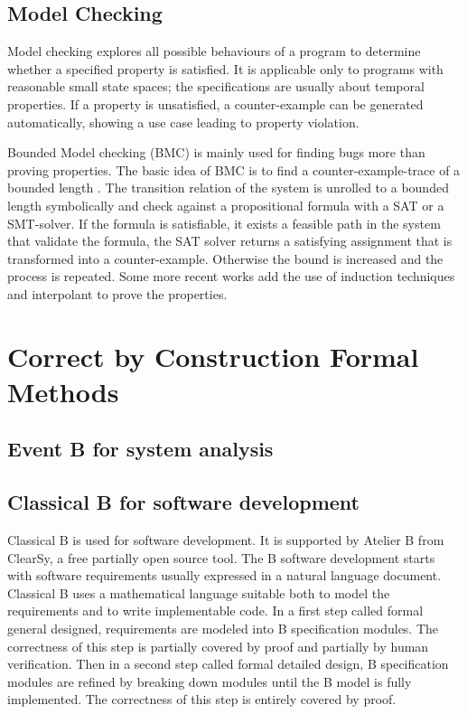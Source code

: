 \section{Model Checking}
\label{sec:Model Checking}

Model checking
\cite{Clarke.Schlingloff.2001}\nocite{Robinson.Voronkov.2001}
explores all possible behaviours of a program to
determine whether a specified property is satisfied.
%
It is applicable only to programs with reasonable small state spaces;
the specifications are usually about temporal properties.
%
If a property is unsatisfied, a counter-example can be generated
automatically,
showing a use case leading to property violation.

Bounded Model checking \cite{biere_symbolic_1999} (BMC) is mainly used
for finding bugs more than proving properties.  The basic idea of BMC
is to find a counter-example-trace of a bounded length . The
transition relation of the system is unrolled to a bounded length
symbolically and check against a propositional formula with a SAT or a
SMT-solver. If the formula is satisfiable, it exists a feasible path
in the system that validate the formula, the SAT solver returns a
satisfying assignment that is transformed into a
counter-example. Otherwise the bound is increased and the process is
repeated. Some more recent works
\cite{bradley_sat-based_2011,McMillan-interpo-2003} add the use of
induction techniques and interpolant to prove the properties.

\chapter{Correct by Construction Formal Methods}
\label{sec:correctbyconstr}


\section{Event B for system analysis}

\begin{comment}
To be completed by Systerel
\end{comment}

\section{Classical B for software development}

Classical B \cite{Abrial1996} is used for software development. It is
supported by Atelier B from ClearSy\cite{atelierb}, a free partially
open source tool. The B software development starts with software
requirements usually expressed in a natural language
document. Classical B uses a mathematical language suitable both to
model the requirements and to write implementable code. In a first
step called formal general designed, requirements are modeled into B
specification modules. The correctness of this step is partially
covered by proof and partially by human verification. Then in a second
step called formal detailed design, B specification modules are
refined by breaking down modules until the B model is fully
implemented. The correctness of this step is entirely covered by
proof.

